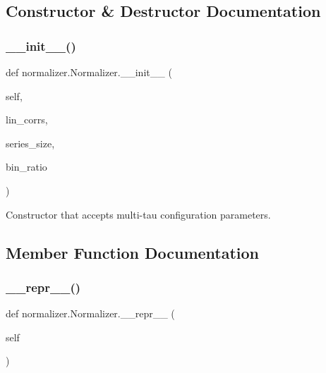 \subsection{Constructor \& Destructor Documentation}
\mbox{\label{classnormalizer_1_1Normalizer_afccec17549a3a8de54c39b7b5de3d4b7}} 
\subsubsection{\texorpdfstring{\+\_\+\+\_\+init\+\_\+\+\_\+()}{\_\_init\_\_()}}
{\footnotesize\ttfamily def normalizer.\+Normalizer.\+\_\+\+\_\+init\+\_\+\+\_\+ (\begin{DoxyParamCaption}\item[{}]{self,  }\item[{}]{lin\+\_\+corrs,  }\item[{}]{series\+\_\+size,  }\item[{}]{bin\+\_\+ratio }\end{DoxyParamCaption})}

\begin{DoxyVerb}Constructor that accepts multi-tau configuration parameters.
\end{DoxyVerb}
 

\subsection{Member Function Documentation}
\mbox{\label{classnormalizer_1_1Normalizer_a09b6d62bec3fca383a1a9c82cc74836a}} 
\subsubsection{\texorpdfstring{\+\_\+\+\_\+repr\+\_\+\+\_\+()}{\_\_repr\_\_()}}
{\footnotesize\ttfamily def normalizer.\+Normalizer.\+\_\+\+\_\+repr\+\_\+\+\_\+ (\begin{DoxyParamCaption}\item[{}]{self }\end{DoxyParamCaption})}

